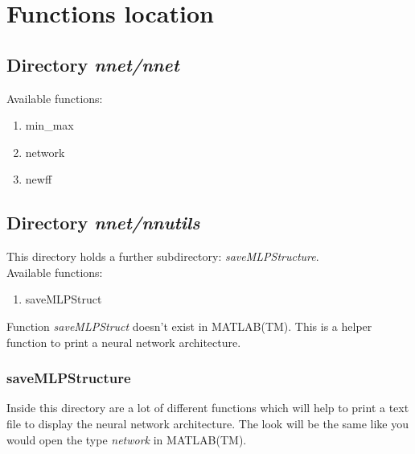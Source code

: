 \section{Functions location}

\subsection{Directory \textit{nnet/nnet}}

\noindent Available functions:
\begin{enumerate}
	\item min\_max
	\item network
  \item newff
\end{enumerate}


\subsection{Directory \textit{nnet/nnutils}}
This directory holds a further subdirectory: \textit{saveMLPStructure}.\\

\noindent Available functions:
\begin{enumerate}
  \item saveMLPStruct
	
\end{enumerate}

Function \textit{saveMLPStruct} doesn't exist in MATLAB(TM). This is a helper function to print a neural network architecture.

\subsubsection{saveMLPStructure}
Inside this directory are a lot of different functions which will help to print a
text file to display the neural network architecture. The look will be the same like
you would open the type \textit{network} in MATLAB(TM).

